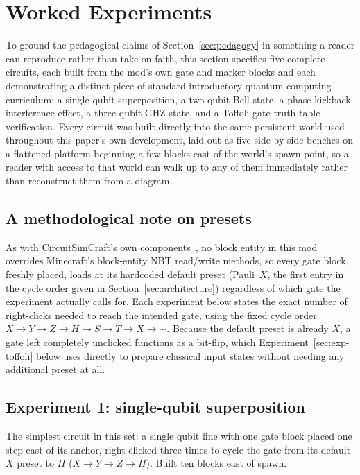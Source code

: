 \section{Worked Experiments}
\label{sec:experiments}

To ground the pedagogical claims of Section~\ref{sec:pedagogy} in something a reader can
reproduce rather than take on faith, this section specifies five complete circuits, each
built from the mod's own gate and marker blocks and each demonstrating a distinct piece of
standard introductory quantum-computing curriculum: a single-qubit superposition, a two-qubit
Bell state, a phase-kickback interference effect, a three-qubit GHZ state, and a
Toffoli-gate truth-table verification. Every circuit was built directly into the same
persistent world used throughout this paper's own development, laid out as five side-by-side
benches on a flattened platform beginning a few blocks east of the world's spawn point, so a
reader with access to that world can walk up to any of them immediately rather than
reconstruct them from a diagram.

\subsection{A methodological note on presets}

As with CircuitSimCraft's own components~\cite{picos2026circuitsimcraft}, no block entity in this
mod overrides Minecraft's block-entity NBT read/write methods, so every gate block, freshly
placed, loads at its hardcoded default preset (Pauli~$X$, the first entry in the cycle order
given in Section~\ref{sec:architecture}) regardless of which gate the experiment actually
calls for. Each experiment below states the exact number of right-clicks needed to reach the
intended gate, using the fixed cycle order
$X \to Y \to Z \to H \to S \to T \to X \to \cdots$. Because the default preset is already
$X$, a gate left completely unclicked functions as a bit-flip, which Experiment~\ref{sec:exp-toffoli}
below uses directly to prepare classical input states without needing any additional preset
at all.

\subsection{Experiment 1: single-qubit superposition}
\label{sec:exp-superposition}

The simplest circuit in this set: a single qubit line with one gate block placed one step
east of its anchor, right-clicked three times to cycle the gate from its default $X$ preset
to $H$ ($X \to Y \to Z \to H$). Built ten blocks east of spawn.

